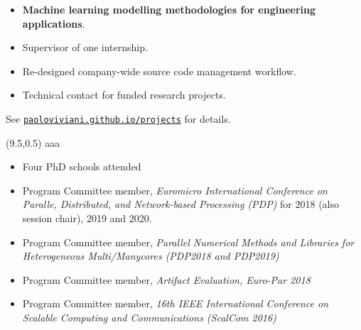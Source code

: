 \documentclass[10pt,a4paper]{altacv}
\begin{document}
\divider

\begin{itemize}
\item \textbf{Machine learning modelling methodologies for engineering applications}.
\item Supervisor of one internship.
\item Re-designed company-wide source code management workflow.
\item Technical contact for funded research projects.
\end{itemize}

\divider

See \href{http://paoloviviani.github.io/projects}{\color{accent}\texttt{paoloviviani.github.io/projects}} for details.
\medskip


\clearpage

\vspace{0.5cm}
\begin{textblock}{10}(9.5,0.5)
  \centering
	aaa
  \vspace{278mm}
\end{textblock}

\renewcommand*{\bibfont}{\small}
\nocite{*}
\medskip
\printbibliography[heading=none]

\divider

\begin{itemize}
\item Four PhD schools attended
\item Program Committee member, \textit{Euromicro International Conference on Paralle, Distributed, and Network-based Processing (PDP)} for 2018 (also session chair), 2019 and 2020.
\item Program Committee member, \textit{Parallel Numerical Methods and Libraries for Heterogeneous Multi/Manycores (PDP2018 and PDP2019)}
\item Program Committee member, \textit{Artifact Evaluation, Euro-Par 2018}
\item Program Committee member, \textit{16th IEEE International Conference on Scalable Computing and Communications (ScalCom 2016)}
\end{itemize}
\end{document}
